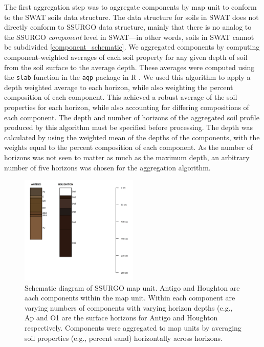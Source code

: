 The first aggregation step was to aggregate components by map unit to conform to
the SWAT soils data structure. The data structure for soils in SWAT does not
directly conform to SSURGO data structure, mainly that there is no analog to the
SSURGO \textit{component} level in SWAT---in other words, soils in SWAT cannot
be subdivided \ref{component_schematic}. We aggregated components by computing
component-weighted averages of each soil property for any given depth of soil from the soil surface to the average depth\cite{gatzke_aggregation_2011, beaudette_algorithms_2013}.
These averages were computed using the \texttt{slab} function in the \texttt{aqp} package in R \cite{beaudette_algorithms_2013}. We
used this algorithm to apply a depth weighted average to each horizon, while
also weighting the percent composition of each component. This achieved a robust
average of the soil properties for each horizon, while also accounting for
differing compositions of each component. The depth and number of horizons of
the aggregated soil profile produced by this algorithm must be specified before
processing. The depth was calculated by using the weighted mean of the depths of
the components, with the weights equal to the percent composition of each
component. As the number of horizons was not seen to matter as much as the
maximum depth, an arbitrary number of five horizons was chosen for the
aggregation algorithm.

\begin{figure}[h]
  \centering
    \includegraphics[width=0.5\textwidth]{./img/component_schematic.png}
	\caption[Schematic diagram of SSURGO map unit]{Schematic diagram of SSURGO map unit. Antigo and Houghton are aach components within the map unit. Within each component are varying numbers of components with varying horizon depths (e.g., Ap and O1 are the surface horizons for Antigo and Houghton respectively. Components were aggregated to map units by averaging soil properties (e.g., percent sand) horizontally across horizons.}
	\label{fig:component_shematic}
\end{figure}

